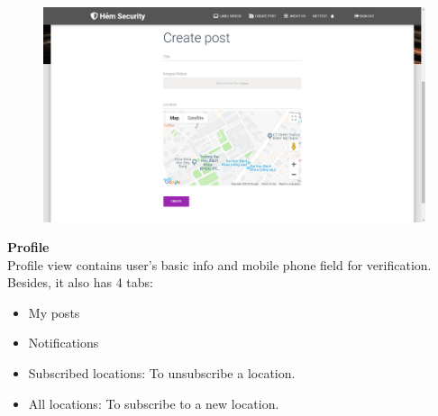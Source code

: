 \begin{figure}[!htb]
\endminipage\hfill
{}
  \includegraphics[width=\linewidth]{images/chap4/create_post.png}
\endminipage
\end{figure}
\cleardoublepage
\textbf{Profile}
\\
Profile view contains user's basic info and mobile phone field for verification. Besides, it also has 4 tabs:  
\begin{itemize}
\item My posts
\item Notifications
\item Subscribed locations: To unsubscribe a location.
\item All locations: To subscribe to a new location.
\end{itemize}
